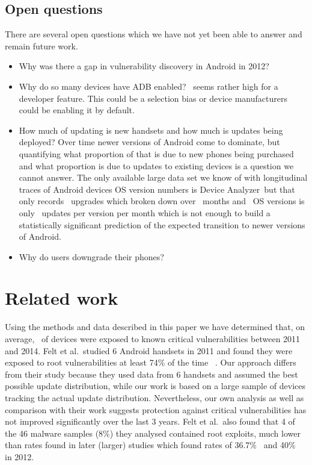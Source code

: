 \documentclass[conference,a4paper,twoside]{IEEEtran}
\newcommand{\da}{Device Analyzer}
\begin{document}
\subsection{Open questions}
There are several open questions which we have not yet been able to answer and remain future work.
\begin{itemize}
 \item Why was there a gap in vulnerability discovery in Android in 2012?
 \item Why do so many devices have ADB enabled? \daAdbEnabledPerc\ seems rather high for a developer feature. This could be a selection bias or device manufacturers could be enabling it by default.
 \item How much of updating is new handsets and how much is updates being deployed? Over time newer versions of Android come to dominate, but quantifying what proportion of that is due to new phones being purchased and what proportion is due to updates to existing devices is a question we cannot answer.
 The only available large data set we know of with longitudinal traces of Android devices OS version numbers is \da\ but that only records \daNumUpdatesUpgrades\ upgrades which broken down over \daOSMonthsOfData\ months and \daNumSigOSVersions\ OS versions is only \daUpdatesPerMonthPerVersion\ updates per version per month which is not enough to build a statistically significant prediction of the expected transition to newer versions of Android.
 \item Why do users downgrade their phones?
\end{itemize}


\section{Related work}
\label{sec:related}
Using the methods and data described in this paper we have determined that, on average, \daMeanInsecurityPerc\ of devices were exposed to known critical vulnerabilities between 2011 and 2014.
Felt et al.\ studied 6 Android handsets in 2011 and found they were exposed to root vulnerabilities at least 74\% of the time~\cite{Felt2011} .
Our approach differs from their study because they used data from 6 handsets and assumed the best possible update distribution, while our work is based on a large sample of devices tracking the actual update distribution.
Nevertheless, our own analysis as well as comparison with their work suggests protection against critical vulnerabilities has not improved significantly over the last 3 years. 
Felt et al.\ also found that 4 of the 46 malware samples (8\%) they analysed contained root exploits, much lower than rates found in later (larger) studies which found rates of 36.7\%~\cite{Zhou2012b} and 40\%~\cite{Zhou2012a} in 2012.
\end{document}
